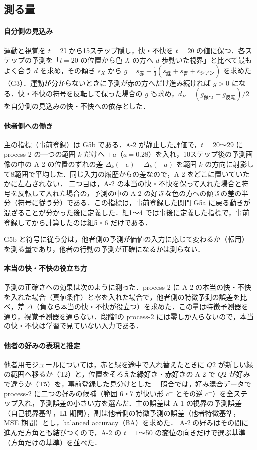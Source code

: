 \subsection{測る量}\label{sec:evaluation}
\paragraph{自分側の見込み}運動と視覚を $t=20$ から15ステップ隠し，快・不快を $t=20$ の値に保つ．各ステップの予測を「$t=20$ の位置から色 $X$ の方へ $d$ 歩動いた視界」と比べて最もよく合う $d$ を求め，その傾き $s_X$ から $g=s_{\text{赤}}-\frac13(s_{\text{緑}}+s_{\text{青}}+s_{\text{シアン}})$ を求めた（G3）．運動が分からないときに予測が赤の方へだけ進み続ければ $g>0$ になる．快・不快の符号を反転して保った場合の $g$ も求め，$d_P=(g_{\text{保つ}}-g_{\text{反転}})/2$ を自分側の見込みの快・不快への依存とした．

\paragraph{他者側への働き}主の指標（事前登録）は G5b である．A-2 が静止した評価で，$t=20$〜29 に process-2 の一つの範囲 $k$ だけへ $\pm a$（$a=0.28$）を入れ，10ステップ後の予測画像の中の A-2 の位置のずれの差 $\Delta_k(+a)-\Delta_k(-a)$ を範囲 $k$ の方向に射影して8範囲で平均した．同じ入力の履歴からの差なので，A-2 をどこに置いていたかに左右されない．
二つ目は，A-2 の本当の快・不快を保って入れた場合と符号を反転して入れた場合の，予測の中の A-2 の好きな色の方への傾きの差の半分（符号に従う分）である．この指標は，事前登録した関門 G5a に戻る動きが混ざることが分かった後に定義した．組1〜4 では事後に定義した指標で，事前登録してから計算したのは組5・6 だけである．

G5b と符号に従う分は，他者側の予測が価値の入力に応じて変わるか（転用）を測る量であり，他者の行動の予測が正確になるかは測らない．

\paragraph{本当の快・不快の役立ち方}予測の正確さへの効果は次のように測った．process-2 に A-2 の本当の快・不快を入れた場合（真値条件）と零を入れた場合で，他者側の特徴予測の誤差を比べ，差 $\Delta$（負なら本当の快・不快が役立つ）を求めた．この量は特徴予測器を通り，視覚予測器を通らない．段階Iの process-2 には零しか入らないので，本当の快・不快は学習で見ていない入力である．

\paragraph{他者の好みの表現と推定}他者用モジュールについては，赤と緑を途中で入れ替えたときに $Q2$ が新しい緑の範囲へ移るか（T2）と，位置をそろえた緑好き・赤好きの A-2 で $Q2$ が好みで違うか（T5）を，事前登録した見分けとした．
照合では，好み混合データで process-2 に二つの好みの候補（範囲 6・7 が快い形 $c^+$ とその逆 $c^-$）を全ステップ入れ，予測誤差の小さい方を選んだ．主の誤差は A-1 の視界の予測誤差（自己視界基準，L1 期間），副は他者側の特徴予測の誤差（他者特徴基準，MSE 期間）とし，balanced accuracy（BA）を求めた．
A-2 の好みはその間に進んだ方角とも結びつくので，A-2 の $t=1$〜50 の変位の向きだけで選ぶ基準（方角だけの基準）を並べた．

